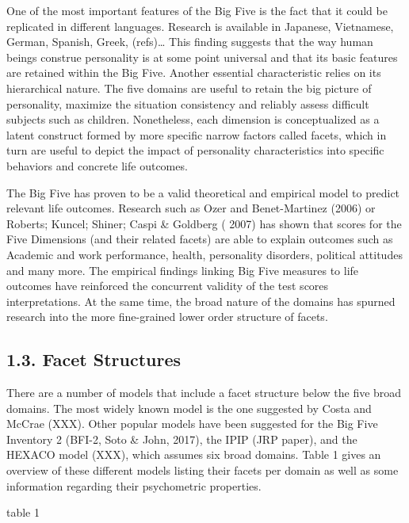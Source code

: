 \documentclass[,man,floatsintext]{apa6}
\theoremstyle{definition}
\theoremstyle{definition}
\theoremstyle{definition}
\theoremstyle{remark}
\begin{document}
One of the most important features of the Big Five is the fact that it
could be replicated in different languages. Research is available in
Japanese, Vietnamese, German, Spanish, Greek, (refs)\ldots{} This
finding suggests that the way human beings construe personality is at
some point universal and that its basic features are retained within the
Big Five. Another essential characteristic relies on its hierarchical
nature. The five domains are useful to retain the big picture of
personality, maximize the situation consistency and reliably assess
difficult subjects such as children. Nonetheless, each dimension is
conceptualized as a latent construct formed by more specific narrow
factors called facets, which in turn are useful to depict the impact of
personality characteristics into specific behaviors and concrete life
outcomes.

The Big Five has proven to be a valid theoretical and empirical model to
predict relevant life outcomes. Research such as Ozer and Benet-Martinez
(2006) or Roberts; Kuncel; Shiner; Caspi \& Goldberg ( 2007) has shown
that scores for the Five Dimensions (and their related facets) are able
to explain outcomes such as Academic and work performance, health,
personality disorders, political attitudes and many more. The empirical
findings linking Big Five measures to life outcomes have reinforced the
concurrent validity of the test scores interpretations. At the same
time, the broad nature of the domains has spurned research into the more
fine-grained lower order structure of facets.

\hypertarget{facet-structures}{%
\subsection{1.3. Facet Structures}\label{facet-structures}}

There are a number of models that include a facet structure below the
five broad domains. The most widely known model is the one suggested by
Costa and McCrae (XXX). Other popular models have been suggested for the
Big Five Inventory 2 (BFI-2, Soto \& John, 2017), the IPIP (JRP paper),
and the HEXACO model (XXX), which assumes six broad domains. Table 1
gives an overview of these different models listing their facets per
domain as well as some information regarding their psychometric
properties.

table 1
\end{document}
